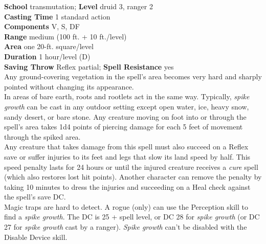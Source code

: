 \textbf{School} transmutation; \textbf{Level} druid 3, ranger 2\\
\textbf{Casting Time} 1 standard action\\
\textbf{Components} V, S, DF\\
\textbf{Range }medium (100 ft. + 10 ft./level)\\
\textbf{Area} one 20-ft. square/level\\
\textbf{Duration} 1 hour/level (D)\\
\textbf{Saving Throw} Reflex partial; \textbf{Spell Resistance} yes\\
Any ground-covering vegetation in the spell's area becomes very hard and sharply pointed without changing its appearance.\\
In areas of bare earth, roots and rootlets act in the same way. Typically, \textit{spike growth }can be cast in any outdoor setting except open water, ice, heavy snow, sandy desert, or bare stone. Any creature moving on foot into or through the spell's area takes 1d4 points of piercing damage for each 5 feet of movement through the spiked area.\\
Any creature that takes damage from this spell must also succeed on a Reflex save or suffer injuries to its feet and legs that slow its land speed by half. This speed penalty lasts for 24 hours or until the injured creature receives a \textit{cure }spell (which also restores lost hit points). Another character can remove the penalty by taking 10 minutes to dress the injuries and succeeding on a Heal check against the spell's save DC.\\
Magic traps are hard to detect. A rogue (only) can use the Perception skill to find a \textit{spike growth}. The DC is 25 + spell level, or DC 28 for \textit{spike growth }(or DC 27 for \textit{spike growth }cast by a ranger).\textit{ Spike growth }can't be disabled with the Disable Device skill.\\
